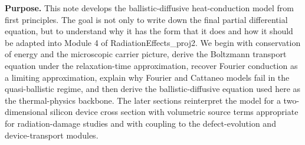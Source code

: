 \documentclass[11pt]{article}
\begin{document}

\begin{overviewbox}
\textbf{Purpose.} This note develops the ballistic-diffusive heat-conduction model from first principles. The goal is not only to write down the final partial differential equation, but to understand why it has the form that it does and how it should be adapted into Module 4 of RadiationEffects\_proj2. We begin with conservation of energy and the microscopic carrier picture, derive the Boltzmann transport equation under the relaxation-time approximation, recover Fourier conduction as a limiting approximation, explain why Fourier and Cattaneo models fail in the quasi-ballistic regime, and then derive the ballistic-diffusive equation used here as the thermal-physics backbone. The later sections reinterpret the model for a two-dimensional silicon device cross section with volumetric source terms appropriate for radiation-damage studies and with coupling to the defect-evolution and device-transport modules.
\end{overviewbox}

\ProjectTOC
\end{document}
